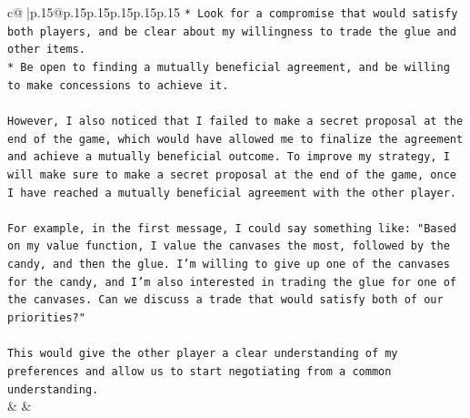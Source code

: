 \documentclass{article}
\begin{document}
{\begin{supertabular}{c@{$\;$}|p{.15\linewidth}@{}p{.15\linewidth}p{.15\linewidth}p{.15\linewidth}p{.15\linewidth}p{.15\linewidth}}
{{{\texttt{* Look for a compromise that would satisfy both players, and be clear about my willingness to trade the glue and other items.} \\
\texttt{* Be open to finding a mutually beneficial agreement, and be willing to make concessions to achieve it.} \\
\\ 
\texttt{However, I also noticed that I failed to make a secret proposal at the end of the game, which would have allowed me to finalize the agreement and achieve a mutually beneficial outcome. To improve my strategy, I will make sure to make a secret proposal at the end of the game, once I have reached a mutually beneficial agreement with the other player.} \\
\\ 
\texttt{For example, in the first message, I could say something like: "Based on my value function, I value the canvases the most, followed by the candy, and then the glue. I'm willing to give up one of the canvases for the candy, and I'm also interested in trading the glue for one of the canvases. Can we discuss a trade that would satisfy both of our priorities?"} \\
\\ 
\texttt{This would give the other player a clear understanding of my preferences and allow us to start negotiating from a common understanding.} \\
            }
        }
    }
    & & \\ \\


\end{supertabular}}
\end{document}
